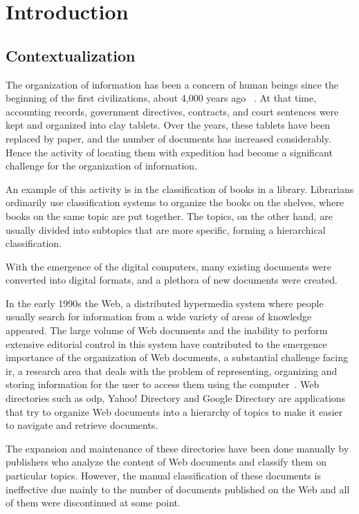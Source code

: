\chapter{\hspace*{3pt} Introduction}
\label{chapter:intro}
\section{\hspace*{3pt}Contextualization}

The organization of information has been a concern of human beings since the beginning of the first civilizations, about 4,000 years ago ~\cite{baeza1999modern}. At that time, accounting records, government directives, contracts, and court sentences were kept and organized into clay tablets. Over the years, these tablets have been replaced by paper, and the number of documents has increased considerably. Hence the activity of locating them with expedition had become a significant challenge for the organization of information.

An example of this activity is in the classification of books in a library. Librarians ordinarily use classification systems to organize the books on the shelves, where books on the same topic are put together. The topics, on the other hand, are usually divided into subtopics that are more specific, forming a hierarchical classification. 

With the emergence of the digital computers, many existing documents were converted into digital formats, and a plethora of new documents were created.


In the early 1990s the Web, a distributed hypermedia system where people usually search for information from a wide variety of areas of knowledge appeared. The large volume of Web documents and the inability to perform extensive editorial control in this system have contributed to the emergence importance of the organization of Web documents, a substantial challenge facing  \gls{ir}, a research area that deals with the problem of representing, organizing and storing information for the user to access them using the computer~\cite{baeza1999modern}. Web directories such as \gls{odp}, Yahoo! Directory and Google Directory are applications that try to organize Web documents into a hierarchy of topics to make it easier to navigate and retrieve documents. 


The expansion and maintenance of these directories have been done manually by publishers who analyze the content of Web documents and classify them on particular topics. However, the manual classification of these documents is ineffective due mainly to the number of documents published on the Web and all of them were discontinued at some point.

